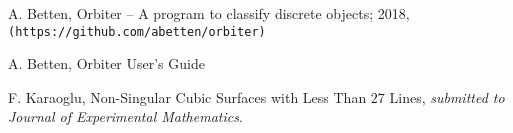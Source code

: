 \documentclass{article}
\begin{document}
\begin{thebibliography}{99}

 A. Betten, Orbiter -- A program to classify discrete objects; 2018,
\verb+(https://github.com/abetten/orbiter)+

 A. Betten, Orbiter User's Guide

F. Karaoglu, Non-Singular Cubic Surfaces with Less Than $27$ Lines, \emph{submitted to Journal of Experimental Mathematics}.
\end{thebibliography}
\end{document}
